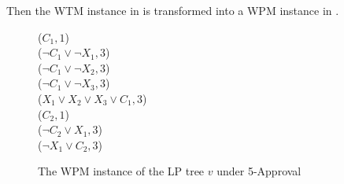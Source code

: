 Then the WTM instance in  is transformed into
a WPM instance in .
\begin{figure}[H]
   \small
	\begin{framed}
		($C_1,1$)\\
		($\neg C_1 \vee \neg X_1, 3$)\\
		($\neg C_1 \vee \neg X_2, 3$)\\
		($\neg C_1 \vee \neg X_3, 3$)\\
		($X_1 \vee X_2 \vee X_3 \vee C_1, 3$)\\
		($C_2, 1$)\\
		($\neg C_2 \vee X_1, 3$)\\
		($\neg X_1 \vee C_2, 3$)
	\end{framed}
	\caption{The WPM instance of the LP tree $v$ under 5-Approval}
  \label{fig:app_wpm}
\end{figure}


